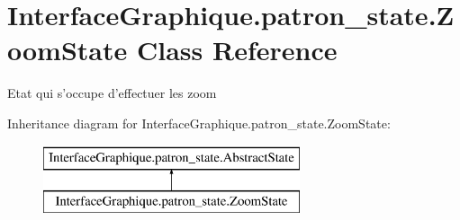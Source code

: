 \hypertarget{class_interface_graphique_1_1patron__state_1_1_zoom_state}{\section{Interface\-Graphique.\-patron\-\_\-state.\-Zoom\-State Class Reference}
\label{class_interface_graphique_1_1patron__state_1_1_zoom_state}
}


Etat qui s'occupe d'effectuer les zoom  


Inheritance diagram for Interface\-Graphique.\-patron\-\_\-state.\-Zoom\-State\-:\begin{figure}[H]
\begin{center}
\leavevmode
\includegraphics[height=2.000000cm]{class_interface_graphique_1_1patron__state_1_1_zoom_state}
\end{center}
\end{figure}
